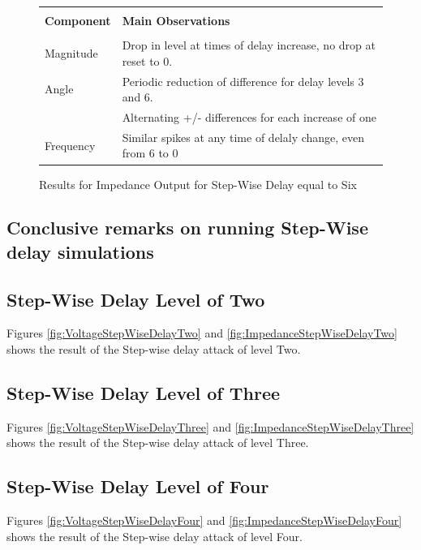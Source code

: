 \begin{figure}[H]
\begin{tabular}{c}
  \end{tabular} 
\caption{Results for Impedance Output for Step-Wise Delay equal to Six}
  \begin{tabular}{p{2cm} p{\textwidth-2cm}}
   & \\
  \textbf{Component} & \textbf{Main Observations} \\
    & \\
      Magnitude  & Drop in level at times of delay increase, no drop at reset to 0. \\
     Angle  &  Periodic reduction of difference for delay levels 3 and 6. \\
                & Alternating +/- differences for each increase of one \\
Frequency &  Similar spikes at any time of delaly change, even from 6 to 0
  \end{tabular}
\label{fig:ImpedanceStepWiseDelaySix}

\end{figure}


\newpage
\subsection{Conclusive remarks on running Step-Wise delay simulations}

\subsection{Step-Wise Delay Level of Two}
Figures \ref{fig:VoltageStepWiseDelayTwo} and \ref{fig:ImpedanceStepWiseDelayTwo} shows the result of the Step-wise delay attack of level Two.
\subsection{Step-Wise Delay Level of Three}
Figures \ref{fig:VoltageStepWiseDelayThree} and \ref{fig:ImpedanceStepWiseDelayThree} shows the result of the Step-wise delay attack of level Three.

\subsection{Step-Wise Delay Level of Four}
Figures \ref{fig:VoltageStepWiseDelayFour} and \ref{fig:ImpedanceStepWiseDelayFour} shows the result of the Step-wise delay attack of level Four.

